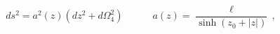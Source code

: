 \begin{equation}
ds^2 =a^2(z)(dz^2+d\Omega^2_4)
\quad\qquad a(z)=\frac{\ell}{\sinh(z_0+|z|)}\,,
\label{metric}
\end{equation}

